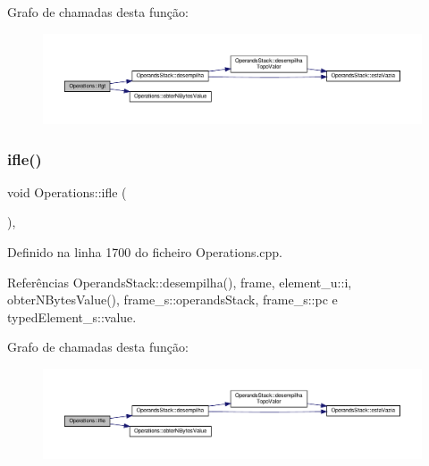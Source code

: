 Grafo de chamadas desta função\+:\nopagebreak
\begin{figure}[H]
\begin{center}
\leavevmode
\includegraphics[width=350pt]{classOperations_afff52b972f58750ea8037aeb02dd22bc_cgraph}
\end{center}
\end{figure}
\mbox{\label{classOperations_a1ef1754372db2e5285a129389274dcc8}} 
\subsubsection{\texorpdfstring{ifle()}{ifle()}}
{\footnotesize\ttfamily void Operations\+::ifle (\begin{DoxyParamCaption}{ }\end{DoxyParamCaption})\hspace{0.3cm}{\ttfamily [static]}, {\ttfamily [private]}}



Definido na linha 1700 do ficheiro Operations.\+cpp.



Referências Operands\+Stack\+::desempilha(), frame, element\+\_\+u\+::i, obter\+N\+Bytes\+Value(), frame\+\_\+s\+::operands\+Stack, frame\+\_\+s\+::pc e typed\+Element\+\_\+s\+::value.

Grafo de chamadas desta função\+:\nopagebreak
\begin{figure}[H]
\begin{center}
\leavevmode
\includegraphics[width=350pt]{classOperations_a1ef1754372db2e5285a129389274dcc8_cgraph}
\end{center}
\end{figure}
\mbox{\label{classOperations_a0a9460ea938fc3a9bbd2102578d50ee2}} 

